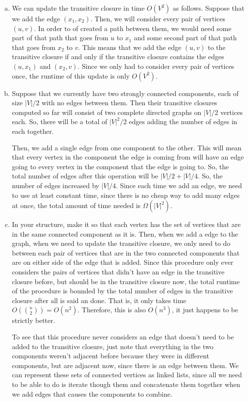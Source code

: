 \documentclass{article}
\begin{document}
\begin{enumerate}[a.]
\item
We can update the transitive closure in time $O(V^2)$ as follows. Suppose that we add the edge $(x_1,x_2)$. Then, we will consider every pair of vertices $(u,v)$. In order to of created a path between them, we would need some part of that path that goes from $u$ to $x_1$ and some second part of that path that goes from $x_2$ to $v$. This means that we add the edge $(u,v)$ to the transitive closure if and only if the transitive closure contains the edges $(u,x_1)$ and $(x_2,v)$. Since we only had to consider every pair of vertices once, the runtime of this update is only $O(V^2)$.
\item
Suppose that we currently have two strongly connected components, each of size $|V|/2$ with no edges between them. Then their transitive closures computed so far will consist of two complete directed graphs on $|V|/2$ vertices each. So, there will be a total of $|V|^2/2$ edges adding the number of edges in each together.

Then, we add a single edge from one component to the other. This will mean that every vertex in the component the edge is coming from will have an edge going to every vertex in the component that the edge is going to. So, the total number of edges after this operation will be $|V|/2 +|V|/4$. So, the number of edges increased by $|V|/4$. Since each time we add an edge, we need to use at least constant time, since there is no cheap way to add many edges at once, the total amount of time needed is $\Omega(|V|^2)$.

\item 
In your structure, make it so that each vertex has the set of vertices that are in the same connected component as it is. Then, when we add a edge to the graph, when we need to update the transitive closure, we only need to do between each pair of vertices that are in the two connected components that are on either side of the edge that is added. Since this procedure only ever considers the pairs of vertices that didn't have an edge in the transitive closure before, but should be in the transitive closure now, the total runtime of the procedure is bounded by the total number of edges in the transitive closure after all is said an done. That is, it only takes time $O(\binom{n}{2}) = O(n^2)$. Therefore, this is also $O(n^3)$, it just happens to be strictly better.

To see that this procedure never considers an edge that doesn't need to be added to the transitive closure, just note that everything in the two components weren't adjacent before because they were in different components, but are adjacent now, since there is an edge between them. We can represent these sets of connected vertices as linked lists, since all we need to be able to do is iterate though them and concatenate them together when we add edges that causes the components to combine.

\end{enumerate}
\end{document}
